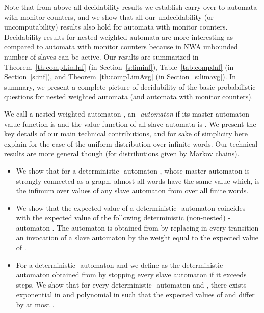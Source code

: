\documentclass{lmcs}
\begin{document}
\noindent
Note that from above all decidability results we establish carry over to
automata with monitor counters, and we show that all our undecidability
(or uncomputability) results also hold for automata with monitor counters.
Decidability results for nested weighted automata are more interesting as
compared to automata with monitor counters because in NWA unbounded number of slaves can be active.
Our results are summarized in Theorem~\ref{th:compLimInf} (in Section~\ref{s:liminf}),
Table~\ref{tab:compInf} (in Section~\ref{s:inf}), and Theorem~\ref{th:compLimAvg} (in Section~\ref{s:limavg}).
In summary, we present a complete picture of decidability of the basic
probabilistic questions for nested weighted automata (and automata with
monitor counters).



\smallskip{}
We call a nested weighted automaton , an \emph{-automaton} if its master-automaton
value function is  and the value function of all slave automata is .
We present the key details of our main technical contributions, and for sake of simplicity here explain for the case of
the uniform distribution over infinite words.
Our technical results are more general though (for distributions given by Markov chains).

\begin{itemize}
\item We show that for a deterministic -automaton , whose master automaton is strongly connected as a graph,
almost all words have the same value which, is the infimum over values of any slave automaton from  over all finite words.

\item We show that the expected value of a deterministic -automaton 
coincides with the expected value of the following deterministic (non-nested)
-automaton .
The automaton  is obtained from  by replacing in every transition
an invocation of a slave automaton  by the weight equal to the expected value of .

\item For a deterministic -automaton  and  we define  as
the deterministic -automaton obtained from  by stopping every slave automaton if it exceeds  steps.
We show that for every deterministic -automaton  and , there exists  exponential in 
and polynomial in  such that the expected values of  and  differ by at most .
\end{itemize}
\end{document}
